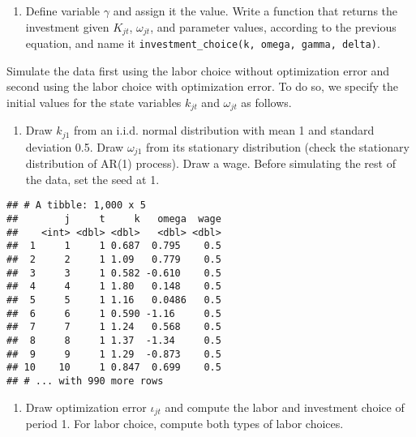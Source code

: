 \documentclass[
]{book}
\providecommand{\tightlist}{%
  \setlength{\itemsep}{0pt}\setlength{\parskip}{0pt}}
\begin{document}
\begin{enumerate}
\def\labelenumi{\arabic{enumi}.}
\setcounter{enumi}{4}
\tightlist
\item
  Define variable \(\gamma\) and assign it the value. Write a function that returns the investment given \(K_{jt}\), \(\omega_{jt}\), and parameter values, according to the previous equation, and name it \texttt{investment\_choice(k,\ omega,\ gamma,\ delta)}.
\end{enumerate}

Simulate the data first using the labor choice without optimization error and second using the labor choice with optimization error. To do so, we specify the initial values for the state variables \(k_{jt}\) and \(\omega_{jt}\) as follows.

\begin{enumerate}
\def\labelenumi{\arabic{enumi}.}
\setcounter{enumi}{5}
\tightlist
\item
  Draw \(k_{j1}\) from an i.i.d. normal distribution with mean 1 and standard deviation 0.5. Draw \(\omega_{j1}\) from its stationary distribution (check the stationary distribution of AR(1) process). Draw a wage. Before simulating the rest of the data, set the seed at 1.
\end{enumerate}

\begin{verbatim}
## # A tibble: 1,000 x 5
##        j     t     k   omega  wage
##    <int> <dbl> <dbl>   <dbl> <dbl>
##  1     1     1 0.687  0.795    0.5
##  2     2     1 1.09   0.779    0.5
##  3     3     1 0.582 -0.610    0.5
##  4     4     1 1.80   0.148    0.5
##  5     5     1 1.16   0.0486   0.5
##  6     6     1 0.590 -1.16     0.5
##  7     7     1 1.24   0.568    0.5
##  8     8     1 1.37  -1.34     0.5
##  9     9     1 1.29  -0.873    0.5
## 10    10     1 0.847  0.699    0.5
## # ... with 990 more rows
\end{verbatim}

\begin{enumerate}
\def\labelenumi{\arabic{enumi}.}
\setcounter{enumi}{6}
\tightlist
\item
  Draw optimization error \(\iota_{jt}\) and compute the labor and investment choice of period 1. For labor choice, compute both types of labor choices.
\end{enumerate}
\end{document}

